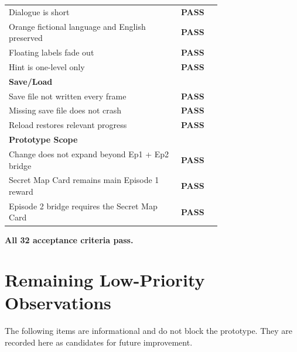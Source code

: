 \documentclass[12pt, a4paper]{article}
\newcommand{\statuspass}{\textcolor{passgre}{\textbf{PASS}}}
\begin{document}
\begin{center}
\begin{longtable}{p{0.60\linewidth} p{0.12\linewidth}}
Dialogue is short & \statuspass \\
Orange fictional language and English preserved & \statuspass \\
Floating labels fade out & \statuspass \\
Hint is one-level only & \statuspass \\
\midrule
\multicolumn{2}{l}{\textbf{Save/Load}} \\
Save file not written every frame & \statuspass \\
Missing save file does not crash & \statuspass \\
Reload restores relevant progress & \statuspass \\
\midrule
\multicolumn{2}{l}{\textbf{Prototype Scope}} \\
Change does not expand beyond Ep1 + Ep2 bridge & \statuspass \\
Secret Map Card remains main Episode 1 reward & \statuspass \\
Episode 2 bridge requires the Secret Map Card & \statuspass \\

\end{longtable}
\end{center}

\textbf{All 32 acceptance criteria pass.}

\section{Remaining Low-Priority Observations}

The following items are informational and do not block the prototype. They
are recorded here as candidates for future improvement.
\end{document}
